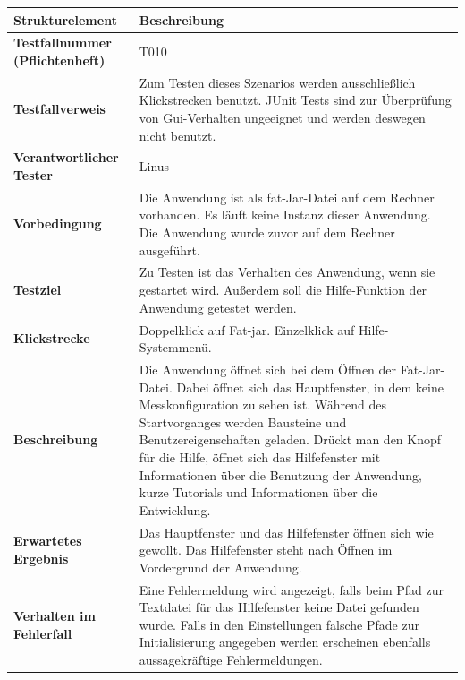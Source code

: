 \documentclass[parskip=full]{scrartcl}
\begin{document}
\begin{table}[h]
\begin{tabular}{| p{4cm} | p{10cm} |}
	\hline
	\textbf{Strukturelement} & \textbf{Beschreibung} \\ \hline
	\textbf{Testfallnummer (Pflichtenheft)}
	& 
	T010
	\\ \hline
	
	\textbf{Testfallverweis}
	& 
	Zum Testen dieses Szenarios werden ausschließlich Klickstrecken benutzt. JUnit Tests sind zur Überprüfung von Gui-Verhalten ungeeignet und werden deswegen nicht benutzt.
	\\ \hline
	
	
	\textbf{Verantwortlicher Tester}
	& 
	Linus
	\\ \hline
	
	
	\textbf{Vorbedingung}
	& 
	Die Anwendung ist als fat-Jar-Datei auf dem Rechner vorhanden. Es läuft keine Instanz dieser Anwendung. Die Anwendung wurde zuvor auf dem Rechner ausgeführt.
	\\ \hline
	
	\textbf{ Testziel}
	& 
	Zu Testen ist das Verhalten des Anwendung, wenn sie gestartet wird. Außerdem soll die Hilfe-Funktion der Anwendung getestet werden.
	\\ \hline

	\textbf{Klickstrecke}
	& 
	Doppelklick auf Fat-jar. Einzelklick auf Hilfe-Systemmenü.
	\\ \hline
	
	
	\textbf{Beschreibung}
	& 
	Die Anwendung öffnet sich bei dem Öffnen der Fat-Jar-Datei. Dabei öffnet sich das Hauptfenster, in dem keine Messkonfiguration zu sehen ist. Während des Startvorganges werden Bausteine und Benutzereigenschaften geladen. Drückt man den Knopf für die Hilfe, öffnet sich das Hilfefenster mit Informationen über die Benutzung der Anwendung, kurze Tutorials und Informationen über die Entwicklung.
	\\ \hline
	
	\textbf{Erwartetes Ergebnis}
	& 
	Das Hauptfenster und das Hilfefenster öffnen sich wie gewollt. Das Hilfefenster steht nach Öffnen im Vordergrund der Anwendung. 
	\\ \hline
			
	\textbf{Verhalten im Fehlerfall}
	& 
	Eine Fehlermeldung wird angezeigt, falls beim Pfad zur Textdatei für das Hilfefenster keine Datei gefunden wurde. Falls in den Einstellungen falsche Pfade zur Initialisierung angegeben werden erscheinen ebenfalls aussagekräftige Fehlermeldungen.
	\\ \hline
	

\end{tabular}
\end{table}
\end{document}
